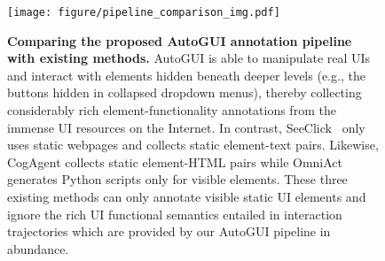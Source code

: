 \begin{figure}[h]
    \centering
    \texttt{[image: figure/pipeline\_comparison\_img.pdf]}
    \caption{\textbf{Comparing the proposed AutoGUI annotation pipeline with existing methods.} AutoGUI is able to manipulate real UIs and interact with elements hidden beneath deeper levels (e.g., the buttons hidden in collapsed dropdown menus), thereby collecting considerably rich element-functionality annotations from the immense UI resources on the Internet. In contrast, SeeClick~\cite{cheng2024seeclick} only uses static webpages and collects static element-text pairs. Likewise, CogAgent collects static element-HTML pairs while OmniAct generates Python scripts only for visible elements. These three existing methods can only annotate visible static UI elements and ignore the rich UI functional semantics entailed in interaction trajectories which are provided by our AutoGUI pipeline in abundance.}
    \label{fig: pipeline comparison}
\end{figure}
